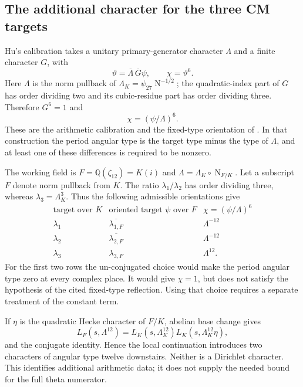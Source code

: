 \documentclass[11pt]{article}
\newcommand{\Q}{\mathbb Q}
\newcommand{\N}{\operatorname{N}}
\theoremstyle{definition}
\theoremstyle{remark}
\begin{document}
\subsection{The additional character for the three CM targets}

Hu's calibration takes a unitary primary-generator character $\Lambda$
and a finite character $G$, with
\[
 \vartheta=\overline\Lambda\,\overline G\psi,
 \qquad\chi=\vartheta^6.
\]
Here $\Lambda$ is the norm pullback of
$\Lambda_K=\psi_{27}\N^{-1/2}$; the quadratic-index part of $G$ has
order dividing two and its cubic-residue part has order dividing three.
Therefore $G^6=1$ and
\begin{equation}\label{eq:auxiliary-character}
 \chi=(\psi/\Lambda)^6.
\end{equation}
These are the arithmetic calibration and the fixed-type orientation
of \cite[Sections~2.2--2.3]{Hu}.  In that construction the period angular
type is the target type minus the type of $\Lambda$, and at least one
of these differences is required to be nonzero.

The working field is $F=\Q(\zeta_{12})=K(i)$ and
$\Lambda=\Lambda_K\circ\N_{F/K}$.  Let a subscript $F$ denote norm
pullback from $K$.  The ratio $\lambda_1/\lambda_2$ has order dividing
three, whereas $\lambda_3=\Lambda_K^3$.
Thus the following admissible orientations give
\[
\begin{array}{c|c|c}
 \text{target over }K&\text{oriented target }\psi\text{ over }F
       &\chi=(\psi/\Lambda)^6\\ \hline
 \lambda_1&\overline{\lambda_{1,F}}&\Lambda^{-12}\\
 \lambda_2&\overline{\lambda_{2,F}}&\Lambda^{-12}\\
 \lambda_3&\lambda_{3,F}&\Lambda^{12}.
\end{array}
\]
For the first two rows the un-conjugated choice would make the period
angular type zero at every complex place.  It would give $\chi=1$,
but does not satisfy the hypothesis of the cited fixed-type reflection.
Using that choice requires a separate treatment of the constant term.

If $\eta$ is the quadratic Hecke character of $F/K$, abelian base
change gives
\[
 L_F(s,\Lambda^{12})
 =L_K(s,\Lambda_K^{12})L_K(s,\Lambda_K^{12}\eta),
\]
and the conjugate identity.  Hence the local continuation introduces
two characters of angular type twelve downstairs.  Neither is a
Dirichlet character.  This identifies additional arithmetic data;
it does not supply the needed bound for the full theta numerator.
\end{document}
